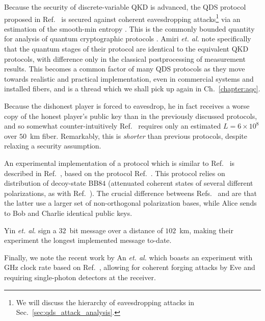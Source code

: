 Because the security of discrete-variable QKD is advanced, the QDS protocol proposed in Ref.~\cite{Amiri2016} is secured against coherent eavesdropping attacks\footnote{We will discuss the hierarchy of eavesdropping attacks in Sec.~\ref{sec:qds_attack_analysis}.} via an estimation of the smooth-min entropy \cite{Konig2009, Tomamichel2016}. This is the commonly bounded quantity for analysis of quantum cryptographic protocols \cite{Tomamichel2012a, Renner2005a}. Amiri \emph{et. al.} note specifically that the quantum stages of their protocol are identical to the equivalent QKD protocols, with difference only in the classical postprocessing of measurement results. This becomes a common factor of many QDS protocols as they move towards realistic and practical implementation, even in commercial systems and installed fibers, and is a thread which we shall pick up again in Ch.~\ref{chapter:aqc}.

Because the dishonest player is forced to eavesdrop, he in fact receives a worse copy of the honest player's public key than in the previously discussed protocols, and so somewhat counter-intuitively Ref.~\cite{Amiri2016} requires only an estimated $L = 6\times 10^8$ over $50$~km fiber. Remarkably, this is \emph{shorter} than previous protocols, despite relaxing a security assumption.


An experimental implementation of a protocol which is similar to Ref.~\cite{Amiri2016} is described in Ref.~\cite{Yin2017c}, based on the protocol Ref.~\cite{Yin2016}. This protocol relies on distribution of decoy-state BB$84$ (attenuated coherent states of several different polarizations, as with Ref.~\cite{Amiri2016}). The crucial difference betweens Refs.~\cite{Amiri2016} and \cite{Yin2016, Yin2017c} are that the latter use a larger set of non-orthogonal polarization bases, while Alice sends to Bob and Charlie identical public keys. %

Yin \emph{et. al.} \cite{Yin2017c} sign a $32$~bit message over a distance of $102$~km, making their experiment the longest implemented message to-date.

Finally, we note the recent work by An \emph{et. al.} \cite{An2019} which boasts an experiment with GHz clock rate based on Ref.~\cite{Amiri2016}, allowing for coherent forging attacks by Eve and requiring single-photon detectors at the receiver.


